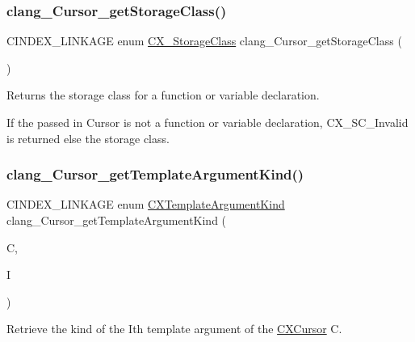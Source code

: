 \subsubsection{\texorpdfstring{clang\+\_\+\+Cursor\+\_\+get\+Storage\+Class()}{clang\_Cursor\_getStorageClass()}}
{\footnotesize\ttfamily C\+I\+N\+D\+E\+X\+\_\+\+L\+I\+N\+K\+A\+GE enum \hyperlink{group__CINDEX__TYPES_ga03a15eaa53465d7f3ce7d88743241d7e}{C\+X\+\_\+\+Storage\+Class} clang\+\_\+\+Cursor\+\_\+get\+Storage\+Class (\begin{DoxyParamCaption}\item[{\hyperlink{structCXCursor}{C\+X\+Cursor}}]{ }\end{DoxyParamCaption})}



Returns the storage class for a function or variable declaration. 

If the passed in Cursor is not a function or variable declaration, C\+X\+\_\+\+S\+C\+\_\+\+Invalid is returned else the storage class. \mbox{\label{group__CINDEX__TYPES_gad657c21f57e009899bd6a0ab618ee321}} 
\subsubsection{\texorpdfstring{clang\+\_\+\+Cursor\+\_\+get\+Template\+Argument\+Kind()}{clang\_Cursor\_getTemplateArgumentKind()}}
{\footnotesize\ttfamily C\+I\+N\+D\+E\+X\+\_\+\+L\+I\+N\+K\+A\+GE enum \hyperlink{group__CINDEX__TYPES_gaf23c39e68c1fc756643583b43ee3e494}{C\+X\+Template\+Argument\+Kind} clang\+\_\+\+Cursor\+\_\+get\+Template\+Argument\+Kind (\begin{DoxyParamCaption}\item[{\hyperlink{structCXCursor}{C\+X\+Cursor}}]{C,  }\item[{unsigned}]{I }\end{DoxyParamCaption})}



Retrieve the kind of the I\textquotesingle{}th template argument of the \hyperlink{structCXCursor}{C\+X\+Cursor} C. 

